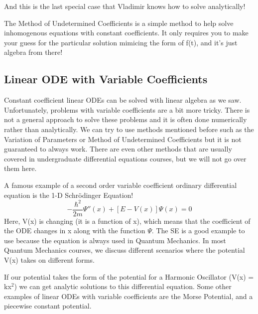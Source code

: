 \documentclass{article}
\newcommand{\be}{\begin{equation}}
\newcommand{\ee}{\end{equation}}
\begin{document}
And this is the last special case that Vladimir knows how to solve analytically!

The Method of Undetermined Coefficients is a simple method to help solve inhomogenous equations with constant coefficients.
It only requires you to make your guess for the particular solution mimicing the form of f(t), and it's just algebra from there!

\subsection*{Linear ODE with Variable Coefficients}
Constant coefficient linear ODEs can be solved with linear algebra as we saw.
Unfortunately, problems with variable coefficients are a bit more tricky.
There is not a general approach to solve these problems and it is often done numerically rather than analytically. 
We can try to use methods mentioned before such as the Variation of Parameters or Method of Undetermined Coefficients but it is not guaranteed to always work.
There are even other methods that are usually covered in undergraduate differential equations courses, but we will not go over them here.

A famous example of a second order variable coefficient ordinary differential equation is the 1-D Schr\"odinger Equation!
\be
-\frac{\hbar^2}{2m} \Psi''(x) + [E - V(x)] \Psi(x) = 0
\ee
Here, V(x) is changing (it is a function of x), which means that the coefficient of the ODE changes in x along with the function $\Psi$.
The SE is a good example to use because the equation is always used in Quantum Mechanics. In most Quantum Mechanics courses, we discuss different scenarios where the potential V(x) takes on different forms.

If our potential takes the form of the potential for a Harmonic Oscillator (V(x) = kx$^2$) we can get analytic solutions to this differential equation.
Some other examples of linear ODEs with variable coefficients are the Morse Potential, and a piecewise constant potential. 
\end{document}
